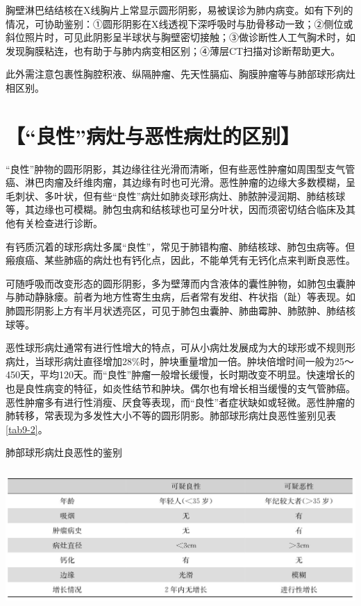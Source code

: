 胸壁淋巴结结核在X线胸片上常显示圆形阴影，易被误诊为肺内病变。如有下列的情况，可协助鉴别：①圆形阴影在X线透视下深呼吸时与肋骨移动一致；②侧位或斜位照片时，可见此阴影呈半球状与胸壁密切接触；③做诊断性人工气胸术时，如发现胸膜粘连，也有助于与肺内病变相区别；④薄层CT扫描对诊断帮助更大。

此外需注意包裹性胸腔积液、纵隔肿瘤、先天性膈疝、胸膜肿瘤等与肺部球形病灶相区别。

\section{【“良性”病灶与恶性病灶的区别】}

“良性”肿物的圆形阴影，其边缘往往光滑而清晰，但有些恶性肿瘤如周围型支气管癌、淋巴肉瘤及纤维肉瘤，其边缘有时也可光滑。恶性肿瘤的边缘大多数模糊，呈毛刺状、多叶状，但有些“良性”病灶如肺炎球形病灶、肺脓肿浸润期、肺结核球等，其边缘也可模糊。肺包虫病和结核球也可呈分叶状，因而须密切结合临床及其他有关检查进行诊断。

有钙质沉着的球形病灶多属“良性”，常见于肺错构瘤、肺结核球、肺包虫病等。但瘢痕癌、某些肺癌的病灶也有钙化点，因此，不能单凭有无钙化点来判断良恶性。

可随呼吸而改变形态的圆形阴影，多为壁薄而内含液体的囊性肿物，如肺包虫囊肿与肺动静脉瘘。前者为地方性寄生虫病，后者常有发绀、杵状指（趾）等表现。如肺圆形阴影上方有半月状透亮区，可见于肺包虫囊肿、肺曲霉肿、肺脓肿、肺结核球等。

恶性球形病灶通常有进行性增大的特点，可从小病灶发展成为大的球形或不规则形病灶，当球形病灶直径增加28\%时，肿块重量增加一倍。肿块倍增时间一般为25～450天，平均120天。而“良性”肿瘤一般增长缓慢，长时期改变不明显。快速增长的也是良性病变的特征，如炎性结节和肿块。偶尔也有增长相当缓慢的支气管肺癌。恶性肿瘤多有进行性消瘦、厌食等表现，而“良性”者症状缺如或轻微。恶性肿瘤的肺转移，常表现为多发性大小不等的圆形阴影。肺部球形病灶良恶性鉴别见表\ref{tab9-2}。

\begin{table}[htbp]
\centering
\caption{肺部球形病灶良恶性的鉴别}
\label{tab9-2}
\includegraphics[width=5.90625in,height=2.08333in]{./images/Image00066.jpg}
\end{table}

